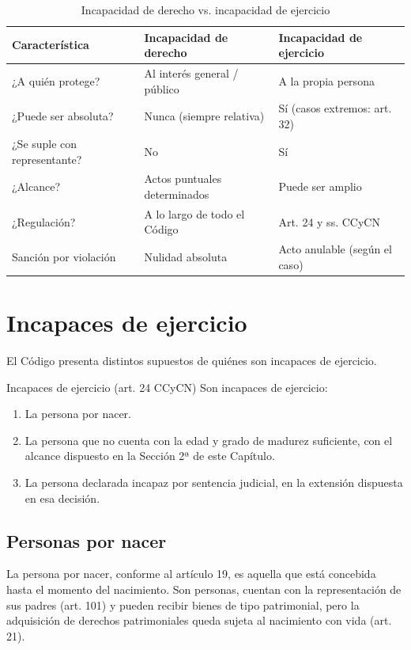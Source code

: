 \documentclass[12pt,oneside]{book}
\begin{document}
\begin{table}[H]
\centering
\caption{Incapacidad de derecho vs. incapacidad de ejercicio}
\begin{tabularx}{\textwidth}{>{\raggedright\arraybackslash}p{} X X}
\toprule
\textbf{Característica} & \textbf{Incapacidad de derecho} & \textbf{Incapacidad de ejercicio} \\
\midrule
¿A quién protege? & Al interés general / público & A la propia persona \\
¿Puede ser absoluta? & Nunca (siempre relativa) & Sí (casos extremos: art. 32) \\
¿Se suple con representante? & No & Sí \\
¿Alcance? & Actos puntuales determinados & Puede ser amplio \\
¿Regulación? & A lo largo de todo el Código & Art. 24 y ss. CCyCN \\
Sanción por violación & Nulidad absoluta & Acto anulable (según el caso) \\
\bottomrule
\end{tabularx}
\end{table}

\section{Incapaces de ejercicio}

El Código presenta distintos supuestos de quiénes son incapaces de ejercicio.

\begin{definition}{Incapaces de ejercicio (art. 24 CCyCN)}
Son incapaces de ejercicio:
\begin{enumerate}[label=(\alph*)]
    \item La persona por nacer.
    \item La persona que no cuenta con la edad y grado de madurez suficiente, con el alcance dispuesto en la Sección 2ª de este Capítulo.
    \item La persona declarada incapaz por sentencia judicial, en la extensión dispuesta en esa decisión.
\end{enumerate}
\end{definition}

\subsection{Personas por nacer}

La persona por nacer, conforme al artículo 19, es aquella que está concebida hasta el momento del nacimiento. Son personas, cuentan con la representación de sus padres (art. 101) y pueden recibir bienes de tipo patrimonial, pero la adquisición de derechos patrimoniales queda sujeta al nacimiento con vida (art. 21).
\end{document}
